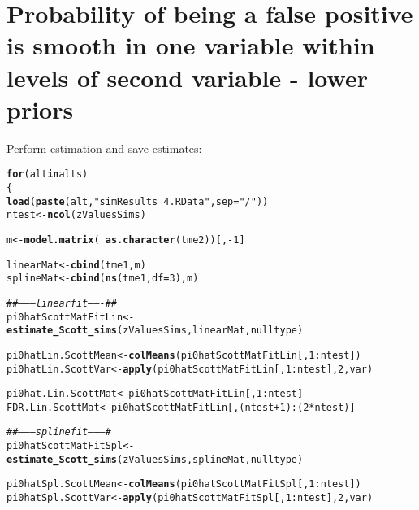 \documentclass{article}\usepackage[]{graphicx}\usepackage[]{color}
\makeatletter
\newcommand{\hlnum}[1]{\textcolor[rgb]{0.686,0.059,0.569}{#1}}%
\newcommand{\hlstr}[1]{\textcolor[rgb]{0.192,0.494,0.8}{#1}}%
\newcommand{\hlcom}[1]{\textcolor[rgb]{0.678,0.584,0.686}{\textit{#1}}}%
\newcommand{\hlopt}[1]{\textcolor[rgb]{0,0,0}{#1}}%
\newcommand{\hlstd}[1]{\textcolor[rgb]{0.345,0.345,0.345}{#1}}%
\newcommand{\hlkwa}[1]{\textcolor[rgb]{0.161,0.373,0.58}{\textbf{#1}}}%
\newcommand{\hlkwb}[1]{\textcolor[rgb]{0.69,0.353,0.396}{#1}}%
\newcommand{\hlkwc}[1]{\textcolor[rgb]{0.333,0.667,0.333}{#1}}%
\newcommand{\hlkwd}[1]{\textcolor[rgb]{0.737,0.353,0.396}{\textbf{#1}}}%
\newenvironment{kframe}{%
 \def\at@end@of@kframe{}%
 \ifinner\ifhmode%
  \def\at@end@of@kframe{\end{minipage}}%
  \begin{minipage}{\columnwidth}%
 \fi\fi%
 \def\FrameCommand##1{\hskip\@totalleftmargin \hskip-\fboxsep
 \colorbox{shadecolor}{##1}\hskip-\fboxsep
     \hskip-\linewidth \hskip-\@totalleftmargin \hskip\columnwidth}%
 \MakeFramed {\advance\hsize-\width
   \@totalleftmargin\z@ \linewidth\hsize
   \@setminipage}}%
 {\par\unskip\endMakeFramed%
 \at@end@of@kframe}
\newenvironment{knitrout}{}{} %
\makeatother
\begin{document}
\section{Probability of being a false positive is smooth in one variable within levels of second variable - lower priors}

Perform estimation and save estimates:

\begin{knitrout}
\color{fgcolor}\begin{kframe}
\begin{alltt}
\hlkwa{for}\hlstd{(alt} \hlkwa{in} \hlstd{alts)}
\hlstd{\{}
  \hlkwd{load}\hlstd{(}\hlkwd{paste}\hlstd{(alt,}\hlstr{"simResults_4.RData"}\hlstd{,}\hlkwc{sep}\hlstd{=}\hlstr{"/"}\hlstd{))}
  \hlstd{ntest} \hlkwb{<-} \hlkwd{ncol}\hlstd{(zValuesSims)}

  \hlstd{m} \hlkwb{<-} \hlkwd{model.matrix}\hlstd{(}\hlopt{~}\hlkwd{as.character}\hlstd{(tme2))[,}\hlopt{-}\hlnum{1}\hlstd{]}

  \hlstd{linearMat} \hlkwb{<-} \hlkwd{cbind}\hlstd{(tme1, m)}
  \hlstd{splineMat} \hlkwb{<-} \hlkwd{cbind}\hlstd{(}\hlkwd{ns}\hlstd{(tme1,}\hlkwc{df}\hlstd{=}\hlnum{3}\hlstd{), m)}

  \hlcom{##--------linear fit-------##}
  \hlstd{pi0hatScottMatFitLin} \hlkwb{<-} \hlkwd{estimate_Scott_sims}\hlstd{(zValuesSims, linearMat, nulltype)}

  \hlstd{pi0hatLin.ScottMean} \hlkwb{<-} \hlkwd{colMeans}\hlstd{(pi0hatScottMatFitLin[,}\hlnum{1}\hlopt{:}\hlstd{ntest])}
  \hlstd{pi0hatLin.ScottVar} \hlkwb{<-} \hlkwd{apply}\hlstd{(pi0hatScottMatFitLin[,}\hlnum{1}\hlopt{:}\hlstd{ntest],}\hlnum{2}\hlstd{,var)}

  \hlstd{pi0hat.Lin.ScottMat} \hlkwb{<-} \hlstd{pi0hatScottMatFitLin[,}\hlnum{1}\hlopt{:}\hlstd{ntest]}
  \hlstd{FDR.Lin.ScottMat} \hlkwb{<-} \hlstd{pi0hatScottMatFitLin[,(ntest}\hlopt{+}\hlnum{1}\hlstd{)}\hlopt{:}\hlstd{(}\hlnum{2}\hlopt{*}\hlstd{ntest)]}

  \hlcom{##---------spline fit---------#}
  \hlstd{pi0hatScottMatFitSpl} \hlkwb{<-} \hlkwd{estimate_Scott_sims}\hlstd{(zValuesSims, splineMat, nulltype)}

  \hlstd{pi0hatSpl.ScottMean} \hlkwb{<-} \hlkwd{colMeans}\hlstd{(pi0hatScottMatFitSpl[,}\hlnum{1}\hlopt{:}\hlstd{ntest])}
  \hlstd{pi0hatSpl.ScottVar} \hlkwb{<-} \hlkwd{apply}\hlstd{(pi0hatScottMatFitSpl[,}\hlnum{1}\hlopt{:}\hlstd{ntest],}\hlnum{2}\hlstd{,var)}


\end{alltt}
\end{kframe}
\end{knitrout}
\end{document}
